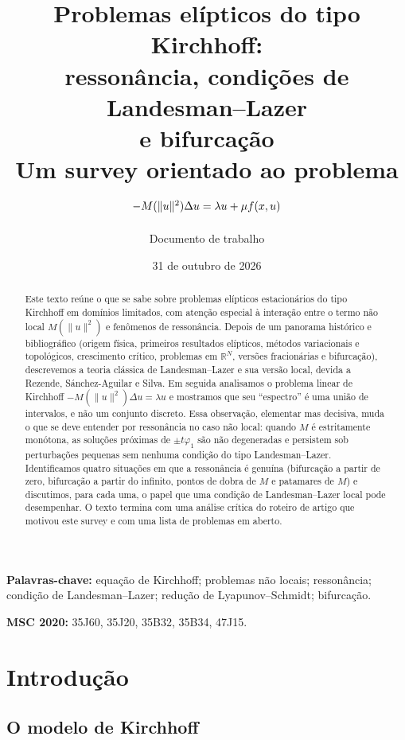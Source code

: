 \documentclass[11pt,a4paper]{article}
\title{\textbf{Problemas elípticos do tipo Kirchhoff:\\
ressonância, condições de Landesman--Lazer\\ e bifurcação}\\[0.4em]
\large Um survey orientado ao problema $-M(\norm{u}^2)\Delta u=\lambda u+\mu f(x,u)$}
\author{Documento de trabalho}
\date{31 de outubro de 2026}
\theoremstyle{plain}
\theoremstyle{definition}
\theoremstyle{remark}
\newcommand{\R}{\mathbb{R}}
\newcommand{\norm}[1]{\lVert #1\rVert}
\begin{document}
\maketitle

\begin{abstract}
Este texto reúne o que se sabe sobre problemas elípticos estacionários do tipo
Kirchhoff em domínios limitados, com atenção especial à interação entre o termo
não local $M(\norm{u}^2)$ e fenômenos de ressonância. Depois de um panorama
histórico e bibliográfico (origem física, primeiros resultados elípticos,
métodos variacionais e topológicos, crescimento crítico, problemas em $\R^N$,
versões fracionárias e bifurcação), descrevemos a teoria clássica de
Landesman--Lazer e sua versão local, devida a Rezende, Sánchez-Aguilar e Silva.
Em seguida analisamos o problema linear de Kirchhoff
$-M(\norm{u}^2)\Delta u=\lambda u$ e mostramos que seu ``espectro'' é uma
união de intervalos, e não um conjunto discreto. Essa observação, elementar mas
decisiva, muda o que se deve entender por ressonância no caso não local: quando
$M$ é estritamente monótona, as soluções próximas de $\pm t\varphi_1$ são não
degeneradas e persistem sob perturbações pequenas sem nenhuma condição do tipo
Landesman--Lazer. Identificamos quatro situações em que a ressonância é genuína
(bifurcação a partir de zero, bifurcação a partir do infinito, pontos de dobra
de $M$ e patamares de $M$) e discutimos, para cada uma, o papel que uma condição
de Landesman--Lazer local pode desempenhar. O texto termina com uma análise
crítica do roteiro de artigo que motivou este survey e com uma lista de
problemas em aberto.
\end{abstract}

\medskip
\noindent\textbf{Palavras-chave:} equação de Kirchhoff; problemas não locais;
ressonância; condição de Landesman--Lazer; redução de Lyapunov--Schmidt;
bifurcação.

\noindent\textbf{MSC 2020:} 35J60, 35J20, 35B32, 35B34, 47J15.

\tableofcontents
\newpage

\section{Introdução}\label{sec:intro}

\subsection{O modelo de Kirchhoff}
\end{document}
